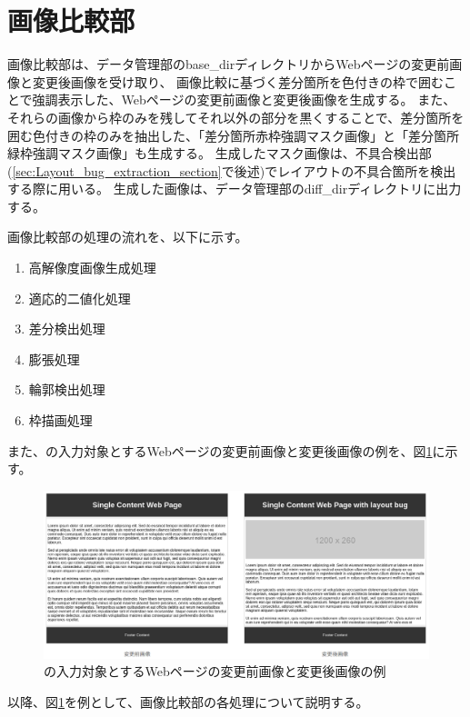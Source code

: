 \section{画像比較部}\label{sec:Difference_extraction_section}
画像比較部は、データ管理部のbase\_dirディレクトリからWebページの変更前画像と変更後画像を受け取り、
画像比較に基づく差分箇所を色付きの枠で囲むことで強調表示した、Webページの変更前画像と変更後画像を生成する。
また、それらの画像から枠のみを残してそれ以外の部分を黒くすることで、差分箇所を囲む色付きの枠のみを抽出した、「差分箇所赤枠強調マスク画像」と「差分箇所緑枠強調マスク画像」も生成する。
生成したマスク画像は、不具合検出部(\ref{sec:Layout_bug_extraction_section}で後述)でレイアウトの不具合箇所を検出する際に用いる。
生成した画像は、データ管理部のdiff\_dirディレクトリに出力する。
\par
画像比較部の処理の流れを、以下に示す。
\begin{enumerate}
    \item 高解像度画像生成処理
    \item 適応的二値化処理
    \item 差分検出処理
    \item 膨張処理
    \item 輪郭検出処理
    \item 枠描画処理
\end{enumerate}
また、\toolName の入力対象とするWebページの変更前画像と変更後画像の例を、図\ref{fig: img_original_bf_af}に示す。
\begin{figure}[tp]
    \begin{center}
        \includegraphics[width=1.0\columnwidth]{image/4_img_original_bf_af.png}
        \caption{\toolName の入力対象とするWebページの変更前画像と変更後画像の例}
        \label{fig: img_original_bf_af}
    \end{center}
\end{figure}
以降、図\ref{fig: img_original_bf_af}を例として、画像比較部の各処理について説明する。

